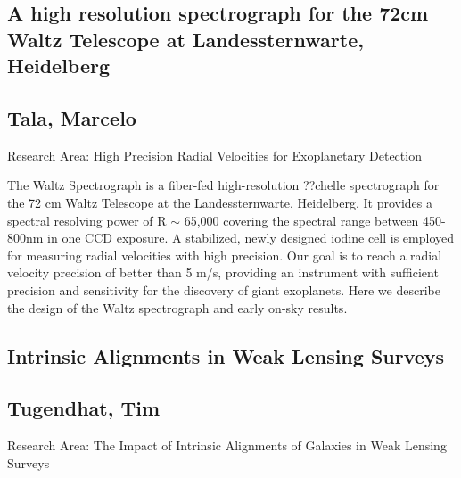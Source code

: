 \subsection*{\centering \large A high resolution spectrograph for the 72cm Waltz Telescope at Landessternwarte, Heidelberg}
\subsection*{\centering \large Tala, Marcelo}
Research Area:  High Precision Radial Velocities for Exoplanetary Detection \newline 

\noindent The Waltz Spectrograph is a fiber-fed high-resolution ??chelle spectrograph for the 72 cm Waltz Telescope at the Landessternwarte, Heidelberg. It provides a spectral resolving power of R $\sim$ 65,000 covering the spectral range between 450-800nm in one CCD exposure. A stabilized, newly designed iodine cell is employed for measuring radial velocities with high precision. Our goal is to reach a radial velocity precision of better than 5 m/s, providing an instrument with sufficient precision and sensitivity for the discovery of giant exoplanets. Here we describe the design of the Waltz spectrograph and early on-sky results.
\newpage
\subsection*{\centering \large Intrinsic Alignments in Weak Lensing Surveys}
\subsection*{\centering \normalsize Tugendhat, Tim}
Research Area: The Impact of Intrinsic Alignments of Galaxies in Weak Lensing Surveys\newline


